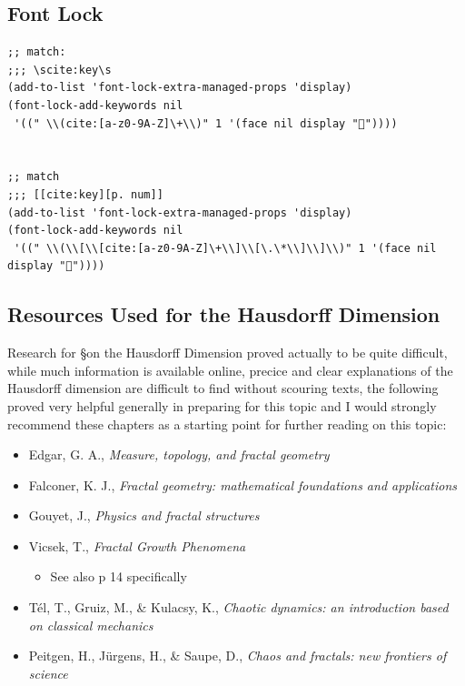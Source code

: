 \documentclass[a4paper,11pt,twoside]{article}
\begin{document}
\subsection{Font Lock}
\label{sec:org0ffdb73}
\begin{verbatim}
;; match:
;;; \scite:key\s
(add-to-list 'font-lock-extra-managed-props 'display)
(font-lock-add-keywords nil
 '((" \\(cite:[a-z0-9A-Z]\+\\)" 1 '(face nil display "🤔"))))


;; match
;;; [[cite:key][p. num]]
(add-to-list 'font-lock-extra-managed-props 'display)
(font-lock-add-keywords nil
 '((" \\(\\[\\[cite:[a-z0-9A-Z]\+\\]\\[\.\*\\]\\]\\)" 1 '(face nil display "🤔"))))
\end{verbatim}
\subsection{Resources Used for the Hausdorff Dimension}
\label{haus-resource}
Research for \S on the Hausdorff Dimension proved actually to be quite difficult, while much information is available online, precice and clear explanations of the Hausdorff dimension are difficult to find without scouring texts, the following proved very helpful generally in preparing for this topic and I would strongly recommend these chapters as a starting point for further reading on this topic:

\begin{itemize}
\item Edgar, G. A., \emph{Measure, topology, and fractal geometry} \cite[Ch. 6]{edgarMeasureTopologyFractal2008a}
\item Falconer, K. J., \emph{Fractal geometry: mathematical foundations and applications}  \cite[Ch. 2]{falconerFractalGeometryMathematical2003b}
\item Gouyet, J., \emph{Physics and fractal structures} \cite[\S1.3]{gouyetPhysicsFractalStructures1996}
\item Vicsek, T., \emph{Fractal Growth Phenomena} \cite[Ch. 4]{vicsekFractalGrowthPhenomena1992}
\begin{itemize}
\item See also p 14 specifically
\end{itemize}
\item Tél, T., Gruiz, M., \& Kulacsy, K., \emph{Chaotic dynamics: an introduction based on classical mechanics}  \cite[\S2.1.2]{telChaoticDynamicsIntroduction2006}
\item Peitgen, H., Jürgens, H., \& Saupe, D., \emph{Chaos and fractals: new frontiers of science}  \cite[\S 4.3]{peitgenChaosFractalsNew2004}
\end{itemize}
\end{document}
